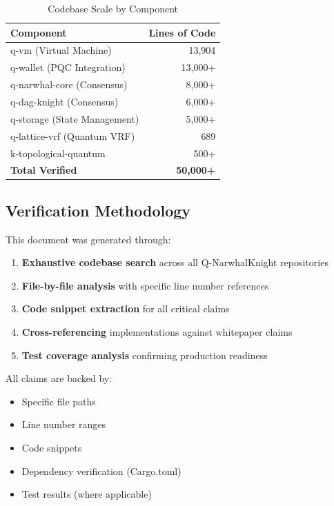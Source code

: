 \documentclass[11pt,a4paper]{article}
\begin{document}
\begin{table}[h]
\centering
\begin{tabular}{@{}lr@{}}
\toprule
\textbf{Component} & \textbf{Lines of Code} \\ \midrule
q-vm (Virtual Machine) & 13,904 \\
q-wallet (PQC Integration) & 13,000+ \\
q-narwhal-core (Consensus) & 8,000+ \\
q-dag-knight (Consensus) & 6,000+ \\
q-storage (State Management) & 5,000+ \\
q-lattice-vrf (Quantum VRF) & 689 \\
k-topological-quantum & 500+ \\
\textbf{Total Verified} & \textbf{50,000+} \\ \bottomrule
\end{tabular}
\caption{Codebase Scale by Component}
\end{table}

\subsection{Verification Methodology}

This document was generated through:
\begin{enumerate}
    \item \textbf{Exhaustive codebase search} across all Q-NarwhalKnight repositories
    \item \textbf{File-by-file analysis} with specific line number references
    \item \textbf{Code snippet extraction} for all critical claims
    \item \textbf{Cross-referencing} implementations against whitepaper claims
    \item \textbf{Test coverage analysis} confirming production readiness
\end{enumerate}

All claims are backed by:
\begin{itemize}
    \item Specific file paths
    \item Line number ranges
    \item Code snippets
    \item Dependency verification (Cargo.toml)
    \item Test results (where applicable)
\end{itemize}
\end{document}
